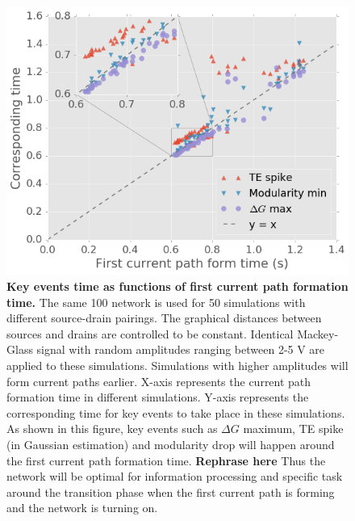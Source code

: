 \documentclass[%
 reprint,
 amsmath,amssymb,
 aps,
floatfix,
]{revtex4-2}
\begin{document}
\begin{figure}[]
	\centering
	\includegraphics[width=1\linewidth]{figure/time_align}
	\caption{\textbf{Key events time as functions of first current path formation time.} 
			The same 100 network is used for 50 simulations with different source-drain pairings. The graphical distances between sources and drains are controlled to be constant. Identical Mackey-Glass signal with random amplitudes ranging between 2-5 V are applied to these simulations. Simulations with higher amplitudes will form current paths earlier. 
			\newline 
			X-axis represents the current path formation time in different simulations. Y-axis represents the corresponding time for key events to take place in these simulations. As shown in this figure, key events such as $\Delta G$ maximum, TE spike (in Gaussian estimation) and modularity drop will happen around the first current path formation time. 
			\newline
			\textbf{Rephrase here} Thus the network will be optimal for information processing and specific task around the transition phase when the first current path is forming and the network is turning on. }
	\label{fig:time_align}
\end{figure}
\end{document}
